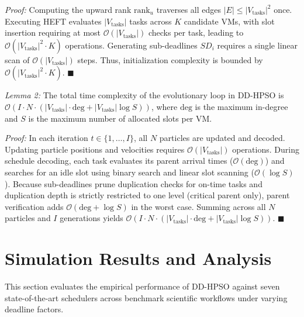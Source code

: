 \documentclass[journal]{IEEEtran}
\begin{document}
\textit{Proof:} Computing the upward rank $\text{rank}_u$ traverses all edges $|E| \le |V_{\text{tasks}}|^2$ once. Executing HEFT evaluates $|V_{\text{tasks}}|$ tasks across $K$ candidate VMs, with slot insertion requiring at most $\mathcal{O}(|V_{\text{tasks}}|)$ checks per task, leading to $\mathcal{O}(|V_{\text{tasks}}|^2 \cdot K)$ operations. Generating sub-deadlines $SD_i$ requires a single linear scan of $\mathcal{O}(|V_{\text{tasks}}|)$ steps. Thus, initialization complexity is bounded by $\mathcal{O}(|V_{\text{tasks}}|^2 \cdot K)$. \hfill $\blacksquare$

\textit{Lemma 2:} The total time complexity of the evolutionary loop in DD-HPSO is $\mathcal{O}\left(I \cdot N \cdot (|V_{\text{tasks}}| \cdot \text{deg} + |V_{\text{tasks}}| \log S)\right)$, where $\text{deg}$ is the maximum in-degree and $S$ is the maximum number of allocated slots per VM.

\textit{Proof:} In each iteration $t \in \{1,\dots,I\}$, all $N$ particles are updated and decoded. Updating particle positions and velocities requires $\mathcal{O}(|V_{\text{tasks}}|)$ operations. During schedule decoding, each task evaluates its parent arrival times ($\mathcal{O}(\text{deg})$) and searches for an idle slot using binary search and linear slot scanning ($\mathcal{O}(\log S)$). Because sub-deadlines prune duplication checks for on-time tasks and duplication depth is strictly restricted to one level (critical parent only), parent verification adds $\mathcal{O}(\text{deg} + \log S)$ in the worst case. Summing across all $N$ particles and $I$ generations yields $\mathcal{O}\left(I \cdot N \cdot (|V_{\text{tasks}}| \cdot \text{deg} + |V_{\text{tasks}}| \log S)\right)$. \hfill $\blacksquare$

\section{Simulation Results and Analysis}
This section evaluates the empirical performance of DD-HPSO against seven state-of-the-art schedulers across benchmark scientific workflows under varying deadline factors.
\end{document}
